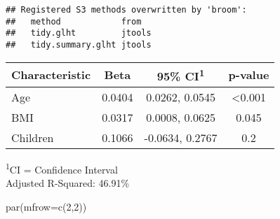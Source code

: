 \documentclass[
]{article}
\newenvironment{Shaded}{\begin{snugshade}}{\end{snugshade}}
\newcommand{\AttributeTok}[1]{\textcolor[rgb]{0.77,0.63,0.00}{#1}}
\newcommand{\DecValTok}[1]{\textcolor[rgb]{0.00,0.00,0.81}{#1}}
\newcommand{\FunctionTok}[1]{\textcolor[rgb]{0.00,0.00,0.00}{#1}}
\newcommand{\NormalTok}[1]{#1}
\newcommand{\SpecialCharTok}[1]{\textcolor[rgb]{0.00,0.00,0.00}{#1}}
\newcommand{\StringTok}[1]{\textcolor[rgb]{0.31,0.60,0.02}{#1}}
\begin{document}
\begin{Shaded}
\end{Shaded}

\begin{verbatim}
## Registered S3 methods overwritten by 'broom':
##   method            from  
##   tidy.glht         jtools
##   tidy.summary.glht jtools
\end{verbatim}

\setlength{\LTpost}{0mm}
\begin{longtable}{lccc}
\toprule
\textbf{Characteristic} & \textbf{Beta} & \textbf{95\% CI}\textsuperscript{1} & \textbf{p-value} \\ 
\midrule
Age & 0.0404 & 0.0262, 0.0545 & <0.001 \\ 
BMI & 0.0317 & 0.0008, 0.0625 & 0.045 \\ 
Children & 0.1066 & -0.0634, 0.2767 & 0.2 \\ 
\bottomrule
\end{longtable}
\begin{minipage}{\linewidth}
\textsuperscript{1}CI = Confidence Interval\\
Adjusted R-Squared: 46.91\%\\
\end{minipage}

\begin{Shaded}
\begin{Highlighting}[]
\FunctionTok{par}\NormalTok{(}\AttributeTok{mfrow=}\FunctionTok{c}\NormalTok{(}\DecValTok{2}\NormalTok{,}\DecValTok{2}\NormalTok{))}
\end{Highlighting}
\end{Shaded}
\end{document}
